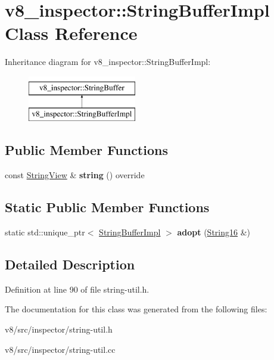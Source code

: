 \hypertarget{classv8__inspector_1_1StringBufferImpl}{}\section{v8\+\_\+inspector\+:\+:String\+Buffer\+Impl Class Reference}
\label{classv8__inspector_1_1StringBufferImpl}
Inheritance diagram for v8\+\_\+inspector\+:\+:String\+Buffer\+Impl\+:\begin{figure}[H]
\begin{center}
\leavevmode
\includegraphics[height=2.000000cm]{classv8__inspector_1_1StringBufferImpl}
\end{center}
\end{figure}
\subsection*{Public Member Functions}
\begin{DoxyCompactItemize}
\item 
\mbox{\label{classv8__inspector_1_1StringBufferImpl_a9a6509783cf0e995fcad8fbc93f5ef01}} 
const \mbox{\hyperlink{classv8__inspector_1_1StringView}{String\+View}} \& {\bfseries string} () override
\end{DoxyCompactItemize}
\subsection*{Static Public Member Functions}
\begin{DoxyCompactItemize}
\item 
\mbox{\label{classv8__inspector_1_1StringBufferImpl_a54d6506d0e51420330e77bd60e1a4ff8}} 
static std\+::unique\+\_\+ptr$<$ \mbox{\hyperlink{classv8__inspector_1_1StringBufferImpl}{String\+Buffer\+Impl}} $>$ {\bfseries adopt} (\mbox{\hyperlink{classv8__inspector_1_1String16}{String16}} \&)
\end{DoxyCompactItemize}


\subsection{Detailed Description}


Definition at line 90 of file string-\/util.\+h.



The documentation for this class was generated from the following files\+:\begin{DoxyCompactItemize}
\item 
v8/src/inspector/string-\/util.\+h\item 
v8/src/inspector/string-\/util.\+cc\end{DoxyCompactItemize}
